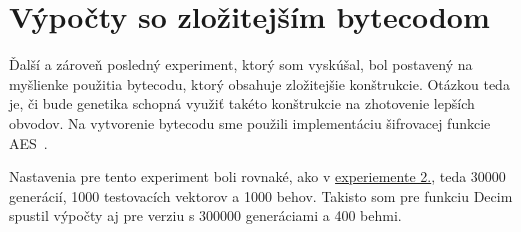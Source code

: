 \section{Výpočty so zložitejším bytecodom}
\label{sec:exp3}

Ďalší a zároveň posledný experiment, ktorý som vyskúšal, bol postavený na myšlienke použitia bytecodu, ktorý obsahuje zložitejšie konštrukcie. Otázkou teda je, či bude genetika schopná využiť takéto konštrukcie na zhotovenie lepších obvodov. Na vytvorenie bytecodu sme použili implementáciu šifrovacej funkcie AES~\parencite{AES-FIPS}.

Nastavenia pre tento experiment boli rovnaké, ako v \hyperref[sec:exp2]{experiemente 2.}, teda 30000 generácií, 1000 testovacích vektorov a 1000 behov. Takisto som pre funkciu Decim spustil výpočty aj pre verziu s 300000 generáciami a 400 behmi. 
